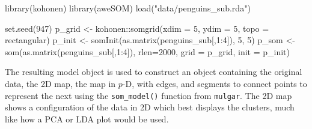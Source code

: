 \documentclass[
  letterpaper,
]{krantz}
\newenvironment{Shaded}{\begin{snugshade}}{\end{snugshade}}
\newcommand{\AttributeTok}[1]{\textcolor[rgb]{0.40,0.45,0.13}{#1}}
\newcommand{\DecValTok}[1]{\textcolor[rgb]{0.68,0.00,0.00}{#1}}
\newcommand{\FunctionTok}[1]{\textcolor[rgb]{0.28,0.35,0.67}{#1}}
\newcommand{\NormalTok}[1]{\textcolor[rgb]{0.00,0.23,0.31}{#1}}
\newcommand{\OtherTok}[1]{\textcolor[rgb]{0.00,0.23,0.31}{#1}}
\newcommand{\SpecialCharTok}[1]{\textcolor[rgb]{0.37,0.37,0.37}{#1}}
\newcommand{\StringTok}[1]{\textcolor[rgb]{0.13,0.47,0.30}{#1}}
\begin{document}
\begin{Shaded}
\begin{Highlighting}[]
\FunctionTok{library}\NormalTok{(kohonen)}
\FunctionTok{library}\NormalTok{(aweSOM)}
\FunctionTok{load}\NormalTok{(}\StringTok{"data/penguins\_sub.rda"}\NormalTok{)}

\FunctionTok{set.seed}\NormalTok{(}\DecValTok{947}\NormalTok{)}
\NormalTok{p\_grid }\OtherTok{\textless{}{-}}\NormalTok{ kohonen}\SpecialCharTok{::}\FunctionTok{somgrid}\NormalTok{(}\AttributeTok{xdim =} \DecValTok{5}\NormalTok{, }\AttributeTok{ydim =} \DecValTok{5}\NormalTok{,}
                           \AttributeTok{topo =} \StringTok{\textquotesingle{}rectangular\textquotesingle{}}\NormalTok{)}
\NormalTok{p\_init }\OtherTok{\textless{}{-}} \FunctionTok{somInit}\NormalTok{(}\FunctionTok{as.matrix}\NormalTok{(penguins\_sub[,}\DecValTok{1}\SpecialCharTok{:}\DecValTok{4}\NormalTok{]), }\DecValTok{5}\NormalTok{, }\DecValTok{5}\NormalTok{)}
\NormalTok{p\_som }\OtherTok{\textless{}{-}} \FunctionTok{som}\NormalTok{(}\FunctionTok{as.matrix}\NormalTok{(penguins\_sub[,}\DecValTok{1}\SpecialCharTok{:}\DecValTok{4}\NormalTok{]), }
             \AttributeTok{rlen=}\DecValTok{2000}\NormalTok{,}
             \AttributeTok{grid =}\NormalTok{ p\_grid,}
             \AttributeTok{init =}\NormalTok{ p\_init)}
\end{Highlighting}
\end{Shaded}

The resulting model object is used to construct an object containing the
original data, the 2D map, the map in \(p\)-D, with edges, and segments
to connect points to represent the next using the \texttt{som\_model()}
function from \texttt{mulgar}. The 2D map shows a configuration of the
data in 2D which best displays the clusters, much like how a PCA or LDA
plot would be used.
\end{document}
